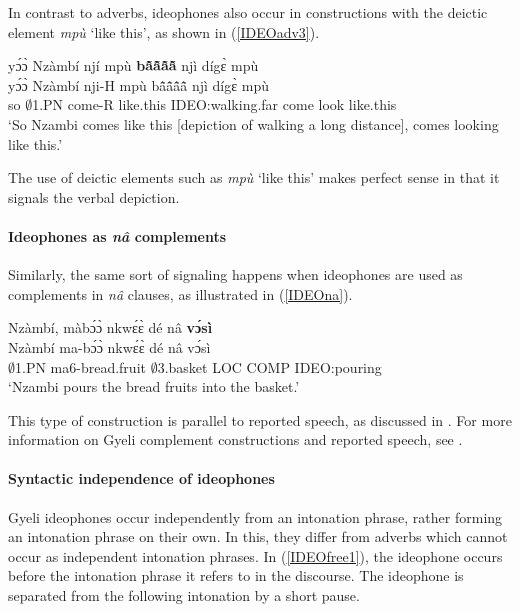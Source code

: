 In contrast to adverbs, ideophones also occur in constructions with the deictic element {\itshape mpù} `like this', as shown in (\ref{IDEOadv3}).


\begin{exe} 
\ex\label{IDEOadv3}
  \glll yɔ́ɔ̀ Nzàmbí njí mpù {\bfseries bã̂ã̂ã̂ã̂} njì dígɛ̀ mpù \\
        yɔ́ɔ̀ Nzàmbí nji-H mpù bã̂ã̂ã̂ã̂ njì dígɛ̀ mpù \\
        so $\emptyset$1.PN come-R like.this IDEO:walking.far come look like.this \\
    \trans `So Nzambi comes like this [depiction of walking a long distance], comes looking like this.'
\end{exe}

\noindent The use of deictic elements such as {\itshape mpù} `like this' makes perfect sense in that it signals  the verbal depiction.


\paragraph{Ideophones as {\itshape nâ} complements} Similarly, the same sort of signaling happens when ideophones are used as complements in {\itshape nâ} clauses, as illustrated in (\ref{IDEOna}).



\begin{exe} 
\ex\label{IDEOna}
  \glll Nzàmbí, màbɔ́ɔ̀ nkwɛ́ɛ̀ dé nâ {\bfseries vɔ́sì} \\
    Nzàmbí ma-bɔ́ɔ̀ nkwɛ́ɛ̀ dé nâ vɔ́sì \\
          $\emptyset$1.PN ma6-bread.fruit $\emptyset$3.basket LOC COMP IDEO:pouring \\
    \trans `Nzambi pours the bread fruits into the basket.'
\end{exe}

\noindent This type of construction is parallel to reported speech, as discussed in \citet{guldemann2008}. For more information on Gyeli complement constructions and reported speech, see .

\paragraph{Syntactic independence of ideophones}
Gyeli ideophones occur independently from an intonation phrase, rather forming an intonation phrase on their own. In this, they differ from adverbs which cannot occur as independent intonation phrases. In (\ref{IDEOfree1}), the ideophone occurs before the intonation phrase it refers to in the discourse. The ideophone is separated from the following intonation by a short pause.

